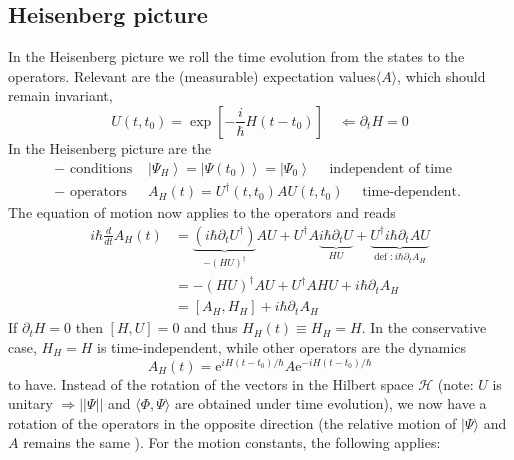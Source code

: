 \subsection{Heisenberg picture}
In the Heisenberg picture we roll the time evolution from the states to the operators. Relevant are the (measurable) expectation values ​​$\langle A\rangle$, which should remain invariant,
\begin{equation}
    U\left(t, t_{0}\right)=\exp \left[-\frac{i}{\hbar} H\left(t-t_{0}\right)\right] \quad \Leftarrow \partial_{t} H=0
    \end{equation}
In the Heisenberg picture are the
%
$$
\begin{array}{ll}{-\text { conditions }} & {\left|\Psi_{H}\right\rangle=\left|\Psi\left(t_{0}\right)\right\rangle=\left|\Psi_{0}\right\rangle \quad \text { independent of time }} \\ {-\text { operators }} & {A_{H}(t)=U^{\dagger}\left(t, t_{0}\right) A U\left(t, t_{0}\right) \quad \text { time-dependent. }}\end{array}
$$
The equation of motion now applies to the operators and reads
\begin{equation}
\begin{aligned} i \hbar \frac{d}{d t} A_{H}(t) &=\underbrace{\left(i \hbar \partial_{t} U^{\dagger}\right)}_{-(H U)^{\dagger}} A U+U^{\dagger} A \underbrace{i \hbar \partial_{t} U}_{H U}+\underbrace{U^{\dagger} i \hbar \partial_{t} A U}_{\text {def }: i \hbar \partial_{t} A_{H}} \\ &=-(H U)^{\dagger} A U+U^{\dagger} A H U+i \hbar \partial_{t} A_{H} \\ &=\left[A_{H}, H_{H}\right]+i \hbar \partial_{t} A_{H} \end{aligned}
\end{equation}
If $\partial_tH = 0$ then $[H, U] = 0$ and thus $H_H (t) \equiv H_H = H$. In the conservative case, $H_H = H$ is time-independent, while other operators are the dynamics
\begin{equation}
    A_{H}(t)=\mathrm{e}^{i H\left(t-t_{0}\right) / \hbar} A \mathrm{e}^{-i H\left(t-t_{0}\right) / \hbar}
    \end{equation}
to have. Instead of the rotation of the vectors in the Hilbert space $\mathcal{H}$ (note: $U$ is unitary $\Rightarrow ||\Psi||$ and $\langle \Phi,\Psi\rangle$ are obtained under time evolution), we now have a rotation of the operators in the opposite direction (the relative motion of $|\Psi\rangle$ and $A$ remains the same ). For the motion constants, the following applies:

